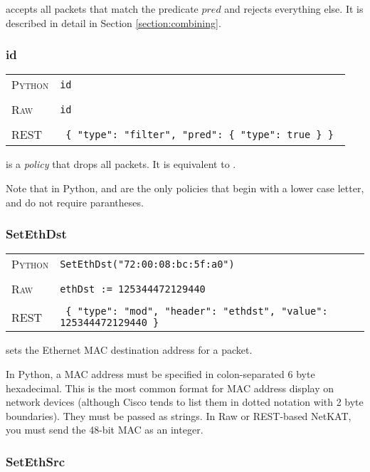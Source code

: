 accepts all packets that match the predicate $pred$ and rejects everything else.
It is described in detail in Section \ref{section:combining}.

\subsubsection{id}

\bigskip
\begin{tabularx}{\linewidth}{lX}
\textsc{Python}   & \texttt{id} \\ \\
\textsc{Raw}   & \texttt{id} \\ \\
\textsc{REST} & \texttt{ \{ "type": "filter", "pred": \{ "type": true \} \} } 
\end{tabularx}

 is a \emph{policy} that drops all packets.  It is equivalent to .

Note that in Python,  and  are the only policies that begin with a lower case
letter, and do not require parantheses.  

\subsubsection{SetEthDst}

\bigskip
\begin{tabularx}{\linewidth}{lX}
\textsc{Python}   & \texttt{SetEthDst("72:00:08:bc:5f:a0")} \\ \\
\textsc{Raw}    & \texttt{ethDst := 125344472129440}     \\ \\
\textsc{REST} & \texttt{ \{ "type": "mod", "header": "ethdst", "value": 125344472129440 \} }
\end{tabularx}

 sets the Ethernet MAC destination address for a packet.    

In Python, a MAC address must be specified in colon-separated 6 byte hexadecimal.  This is the most common format
for MAC address display on network devices (although Cisco tends to list them in dotted notation with 2 byte
boundaries).  They must be passed as strings.  In Raw or REST-based NetKAT, you must send the 48-bit MAC as 
an integer.  

\subsubsection{SetEthSrc}


